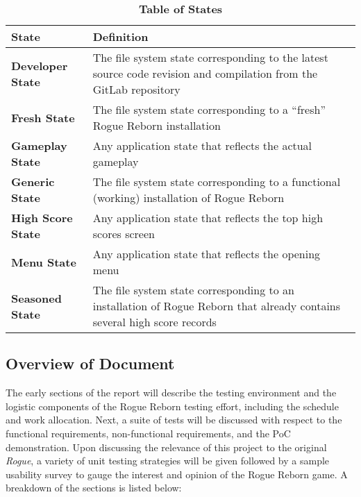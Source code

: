 \documentclass[12pt, titlepage]{article}
\begin{document}
		\begin{table}[H]
			\centering
			\caption{\textbf{Table of States}}
			\label{StateDefinitions}
			\bigskip
			\begin{tabularx}{\textwidth}{p{3.5cm}X}
				\toprule
				\textbf{State} & \textbf{Definition}\\
				\midrule
				\textbf{Developer State} & The file system state corresponding to the latest source code revision and compilation from the GitLab repository\\
				\textbf{Fresh State} & The file system state corresponding to a ``fresh'' Rogue Reborn installation\\
				\textbf{Gameplay State} & Any application state that reflects the actual gameplay\\
				\textbf{Generic State} & The file system state corresponding to a functional (working) installation of Rogue Reborn\\
				\textbf{High Score State} & Any application state that reflects the top high scores screen\\
				\textbf{Menu State} & Any application state that reflects the opening menu\\
				\textbf{Seasoned State} & The file system state corresponding to an installation of Rogue Reborn that already contains several high score records\\
				\bottomrule
			\end{tabularx}
		\end{table}	

	\subsection{Overview of Document}
		The early sections of the report will describe the testing environment and the logistic components of the Rogue Reborn testing effort, including the schedule and work allocation.  Next, a suite of tests will be discussed with respect to the functional requirements, non-functional requirements, and the PoC demonstration.  Upon discussing the relevance of this project to the original \textit{Rogue}, a variety of unit testing strategies will be given followed by a sample usability survey to gauge the interest and opinion of the Rogue Reborn game.  A breakdown of the sections is listed below:
\end{document}
